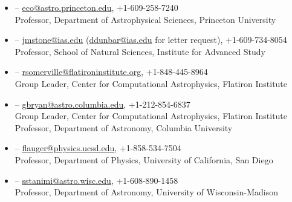 \documentclass[12pt,preprint,letterpaper]{aastex63}
\begin{document}
\begin{itemize}

\item \subtitle{Eve Ostriker} --
\url{eco@astro.princeton.edu}, +1-609-258-7240\\
Professor, Department of Astrophysical Sciences, Princeton University

\item \subtitle{James Stone} --
\url{jmstone@ias.edu} (\url{ddunbar@ias.edu} for letter request), +1-609-734-8054\\
Professor, School of Natural Sciences, Institute for Advanced Study 

\item \subtitle{Rachel Somerville} --
\url{rsomerville@flatironinstitute.org}, +1-848-445-8964\\
Group Leader, Center for Computational Astrophysics, Flatiron Institute

\item \subtitle{Greg Bryan} --
\url{gbryan@astro.columbia.edu}, +1-212-854-6837\\
Group Leader, Center for Computational Astrophysics, Flatiron Institute\\
Professor, Department of Astronomy, Columbia University

\item \subtitle{Raphael Flauger} --
\url{flauger@physics.ucsd.edu}, +1-858-534-7504\\
Professor, Department of Physics, University of California, San Diego

\item \subtitle{Snezana Stanimirovi\'c} --
\url{sstanimi@astro.wisc.edu}, +1-608-890-1458\\
Professor, Department of Astronomy, University of Wisconsin-Madison



\end{itemize}
\end{document}
